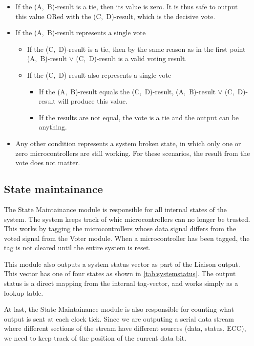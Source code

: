 \begin{itemize}
\item If the (A,~B)-result is a tie, then its value is zero. It is
  thus safe to output this value ORed with the (C,~D)-result, which is
  the decisive vote.

\item If the (A,~B)-result represents a single vote
  \begin{itemize}
  \item If the (C,~D)-result is a tie, then by the same reason as in
    the first point (A,~B)-result $\vee$ (C,~D)-result is a valid
    voting result.

  \item If the (C,~D)-result also represents a single vote
    \begin{itemize}
    \item If the (A,~B)-result equals the (C,~D)-result, (A,~B)-result
      $\vee$ (C,~D)-result will produce this value.
    \item If the results are not equal, the vote is a tie and the
      output can be anything.
    \end{itemize}
  \end{itemize}

\item Any other condition represents a system broken state, in which
  only one or zero microcontrollers are still working. For these
  scenarios, the result from the vote does not matter.

\end{itemize}

\subsection{State maintainance}
The State Maintainance module is responsible for all internal states
of the system. The system keeps track of whic microcontrollers can no
longer be trusted. This works by tagging the microcontrollers whose
data signal differs from the voted signal from the Voter module. When
a microcontroller has been tagged, the tag is not cleared until the
entire system is reset.

This module also outputs a system status vector as part of the Liaison
output. This vector has one of four states as shown in
\autoref{tab:systemstatus}.  The output status is a direct mapping
from the internal tag-vector, and works simply as a lookup table.

At last, the State Maintainance module is also responsible for
counting what output is sent at each clock tick. Since we are
outputing a serial data stream where different sections of the stream
have different sources (data, status, ECC), we need to keep track of
the position of the current data bit.



